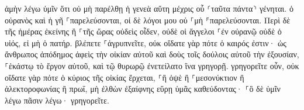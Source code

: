 \documentclass{openreader}
\begin{document}
ἀμὴν λέγω ὑμῖν ὅτι οὐ μὴ παρέλθῃ ἡ γενεὰ αὕτη μέχρις οὗ ⸂ταῦτα πάντα⸃ γένηται. 
ὁ οὐρανὸς καὶ ἡ γῆ ⸀παρελεύσονται, οἱ δὲ λόγοι μου οὐ ⸀μὴ ⸁παρελεύσονται. 
Περὶ δὲ τῆς ἡμέρας ἐκείνης ἢ ⸀τῆς ὥρας οὐδεὶς οἶδεν, οὐδὲ οἱ ἄγγελοι ⸀ἐν οὐρανῷ οὐδὲ ὁ υἱός, εἰ μὴ ὁ πατήρ. 
βλέπετε ⸀ἀγρυπνεῖτε, οὐκ οἴδατε γὰρ πότε ὁ καιρός ἐστιν· 
ὡς ἄνθρωπος ἀπόδημος ἀφεὶς τὴν οἰκίαν αὐτοῦ καὶ δοὺς τοῖς δούλοις αὐτοῦ τὴν ἐξουσίαν, ⸀ἑκάστῳ τὸ ἔργον αὐτοῦ, καὶ τῷ θυρωρῷ ἐνετείλατο ἵνα γρηγορῇ. 
γρηγορεῖτε οὖν, οὐκ οἴδατε γὰρ πότε ὁ κύριος τῆς οἰκίας ἔρχεται, ⸀ἢ ὀψὲ ἢ ⸀μεσονύκτιον ἢ ἀλεκτοροφωνίας ἢ πρωΐ, 
μὴ ἐλθὼν ἐξαίφνης εὕρῃ ὑμᾶς καθεύδοντας· 
⸀ὃ δὲ ὑμῖν λέγω πᾶσιν λέγω· γρηγορεῖτε. 
\end{document}
